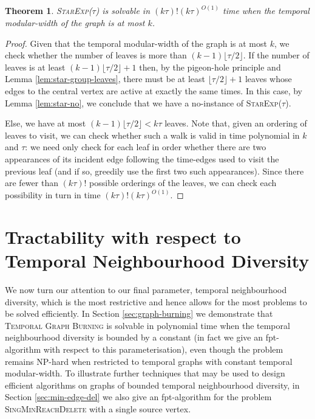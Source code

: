 \documentclass[preprint,12pt]{elsarticle}
\newtheorem{theorem}{Theorem}
\begin{document}
\begin{theorem}\label{thm:star-tractable-modular}
    \textsc{StarExp($\tau$)} is solvable in $(k\tau)!(k\tau)^{O(1)}$ time when the temporal modular-width of the graph is at most $k$.
\end{theorem}
\begin{proof}
    Given that the temporal modular-width of the graph is at most $k$, we check whether the number of leaves is more than $(k-1)\lfloor \tau / 2 \rfloor$. If the number of leaves is at least $(k-1)\lfloor \tau / 2 \rfloor + 1$ then, by the pigeon-hole principle and Lemma \ref{lem:star-group-leaves}, there must be at least $\lfloor \tau / 2 \rfloor + 1$ leaves whose edges to the central vertex are active at exactly the same times.  In this case, by Lemma \ref{lem:star-no}, we conclude that we have a no-instance of \textsc{StarExp($\tau$)}.
    
    Else, we have at most $(k-1)\lfloor \tau / 2 \rfloor < k \tau$ leaves. Note that, given an ordering of leaves to visit, we can check whether such a walk is valid in time polynomial in $k$ and $\tau$: we need only check for each leaf in order whether there are two appearances of its incident edge following the time-edges used to visit the previous leaf (and if so, greedily use the first two such appearances). Since there are fewer than $(k\tau)!$ possible orderings of the leaves, we can check each possibility in turn in time $(k\tau)!(k\tau)^{O(1)}$. 
\end{proof}

\section{Tractability with respect to Temporal Neighbourhood Diversity}\label{sec:TND}

We now turn our attention to our final parameter, temporal neighbourhood diversity, which is the most restrictive and hence allows for the most problems to be solved efficiently.  In Section \ref{sec:graph-burning} we demonstrate that \textsc{Temporal Graph Burning} is solvable in polynomial time when the temporal neighbourhood diversity is bounded by a constant (in fact we give an fpt-algorithm with respect to this parameterisation), even though the problem remains NP-hard when restricted to temporal graphs with constant temporal modular-width.  To illustrate further techniques that may be used to design efficient algorithms on graphs of bounded temporal neighbourhood diversity, in Section \ref{sec:min-edge-del} we also give an fpt-algorithm for the problem \textsc{SingMinReachDelete} with a single source vertex.
\end{document}
